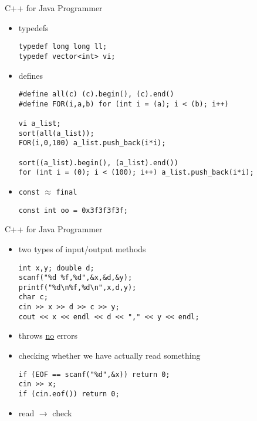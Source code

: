 \documentclass[12pt,t]{beamer}
\newcommand{\bi}{\begin{itemize}}
\newcommand{\ei}{\end{itemize}}
\begin{document}
\begin{frame}[fragile]{C++ for Java Programmer}
    \vspace{10pt}
    \bi
      \item typedefs
        \begin{verbatim}
typedef long long ll;
typedef vector<int> vi;
        \end{verbatim}
        
       \item defines
        \begin{verbatim}
#define all(c) (c).begin(), (c).end()
#define FOR(i,a,b) for (int i = (a); i < (b); i++)

vi a_list;
sort(all(a_list));
FOR(i,0,100) a_list.push_back(i*i);

sort((a_list).begin(), (a_list).end())
for (int i = (0); i < (100); i++) a_list.push_back(i*i);
	\end{verbatim}       
       \item \texttt{const} $\approx$ \texttt{final}
        \begin{verbatim}
const int oo = 0x3f3f3f3f;
	\end{verbatim}       
    \ei
\end{frame}

\begin{frame}[fragile]{C++ for Java Programmer}
    \vspace{10pt}
    \bi
      \item two types of input/output methods
        \begin{verbatim}
int x,y; double d;
scanf("%d %f,%d",&x,&d,&y);
printf("%d\n%f,%d\n",x,d,y);
char c;
cin >> x >> d >> c >> y;
cout << x << endl << d << "," << y << endl;
	\end{verbatim}  
	\item throws \underline{no} errors
	\item checking whether we have actually read something
	\begin{verbatim}
if (EOF == scanf("%d",&x)) return 0;
cin >> x;
if (cin.eof()) return 0;
	\end{verbatim}
	\item read $\rightarrow$ check
    \ei
\end{frame}
\end{document}
